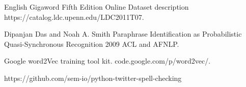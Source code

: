 \documentclass[conference]{IEEEtran}
\begin{document}
\begin{thebibliography}{1}
English Gigaword Fifth Edition
Online Dataset description
https://catalog.ldc.upenn.edu/LDC2011T07.

Dipanjan Das and Noah A. Smith
Paraphrase Identification as Probabilistic Quasi-Synchronous Recognition
2009 ACL and AFNLP.

Google word2Vec training tool kit. code.google.com/p/word2vec/.

https://github.com/sem-io/python-twitter-spell-checking
\end{thebibliography}



\end{document}
